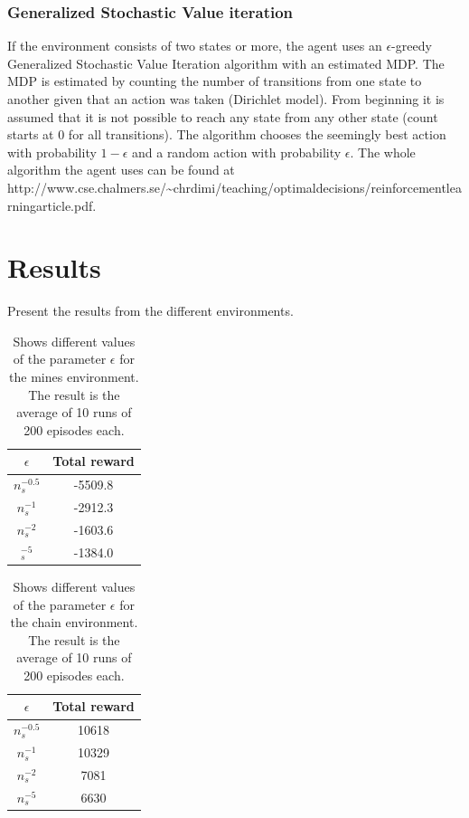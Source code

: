 \documentclass[11pt]{article}
\numberwithin{equation}{section}
\begin{document}
\begin{flushleft}
\subsubsection{Generalized Stochastic Value iteration}

If the environment consists of two states or more, the agent uses an $\epsilon$-greedy Generalized Stochastic Value Iteration algorithm with an estimated MDP. The MDP is estimated by counting the number of transitions from one state to another given that an action was taken (Dirichlet model). From beginning it is assumed that it is not possible to reach any state from any other state (count starts at 0 for all transitions). The algorithm chooses the seemingly best action with probability $1-\epsilon$ and a random action with probability $\epsilon$. The whole algorithm the agent uses can be found at http://www.cse.chalmers.se/\textasciitilde chrdimi/teaching/optimal\textunderscore decisions/reinforcement\textunderscore learning\textunderscore article.pdf.

\section{Results}

Present the results from the different environments.

\begin{table}[H]
\caption{Shows different values of the parameter $\epsilon$ for the mines environment. The result is the average of 10 runs of 200 episodes each.}
\begin{center}
\begin{tabular}{|c|c|}
\hline
$\epsilon$ & Total reward \\ \hline
$n_s^{-0.5}$ & -5509.8 \\ \hline
$n_s^{-1}$ & -2912.3 \\ \hline
$n_s^{-2}$ & -1603.6 \\ \hline
$_s^{-5}$ & -1384.0 \\
\hline
\end{tabular}
\label{tab:minesMean}
\end{center}
\end{table}

\begin{table}[H]
\caption{Shows different values of the parameter $\epsilon$ for the chain environment. The result is the average of 10 runs of 200 episodes each.}
\begin{center}
\begin{tabular}{|c|c|}
\hline
$\epsilon$ & Total reward \\ \hline
$n_s^{-0.5}$ & 10618 \\ \hline
$n_s^{-1}$ & 10329 \\ \hline
$n_s^{-2}$ & 7081 \\ \hline
$n_s^{-5}$ & 6630 \\
\hline
\end{tabular}
\label{tab:chainMean}
\end{center}
\end{table}


\end{flushleft}
\end{document}
